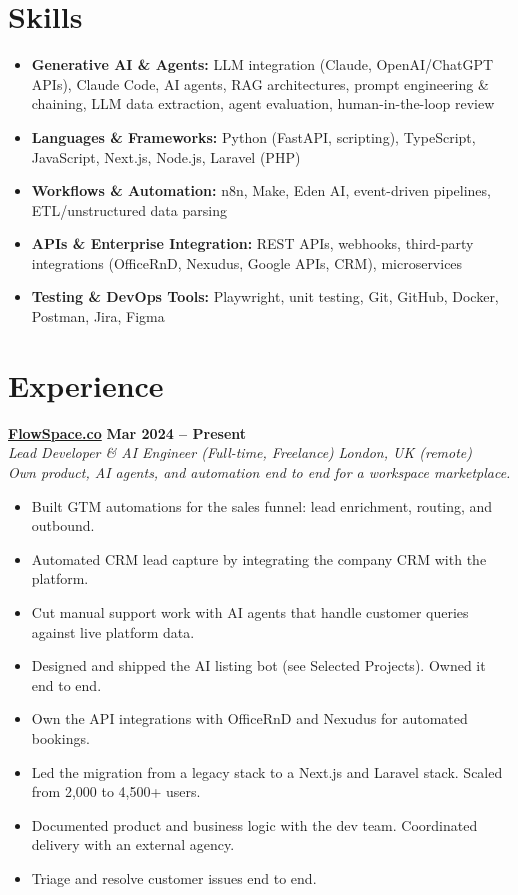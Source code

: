 \documentclass[a4paper,10pt]{article}
\newcommand{\role}[4]{%
 \textbf{#1} \hfill \textbf{#2}\\[1pt]%
 \textit{#3} \hfill \textit{#4}\\[2pt]%
}
\begin{document}
\section{Skills}
\begin{itemize}
 \item \textbf{Generative AI \& Agents:} LLM integration (Claude, OpenAI/ChatGPT APIs), Claude Code, AI agents, RAG architectures, prompt engineering \& chaining, LLM data extraction, agent evaluation, human-in-the-loop review
 \item \textbf{Languages \& Frameworks:} Python (FastAPI, scripting), TypeScript, JavaScript, Next.js, Node.js, Laravel (PHP)
 \item \textbf{Workflows \& Automation:} n8n, Make, Eden AI, event-driven pipelines, ETL/unstructured data parsing
 \item \textbf{APIs \& Enterprise Integration:} REST APIs, webhooks, third-party integrations (OfficeRnD, Nexudus, Google APIs, CRM), microservices
 \item \textbf{Testing \& DevOps Tools:} Playwright, unit testing, Git, GitHub, Docker, Postman, Jira, Figma
\end{itemize}

\section{Experience}

\role{\href{https://flowspace.co}{FlowSpace.co}}{Mar 2024 -- Present}{Lead Developer \& AI Engineer (Full-time, Freelance)}{London, UK (remote)}
\textit{Own product, AI agents, and automation end to end for a workspace marketplace.}
\begin{itemize}
 \item Built GTM automations for the sales funnel: lead enrichment, routing, and outbound.
 \item Automated CRM lead capture by integrating the company CRM with the platform.
 \item Cut manual support work with AI agents that handle customer queries against live platform data.
 \item Designed and shipped the AI listing bot (see Selected Projects). Owned it end to end.
 \item Own the API integrations with OfficeRnD and Nexudus for automated bookings.
 \item Led the migration from a legacy stack to a Next.js and Laravel stack. Scaled from 2,000 to 4,500+ users.
 \item Documented product and business logic with the dev team. Coordinated delivery with an external agency.
 \item Triage and resolve customer issues end to end.
\end{itemize}
\end{document}
